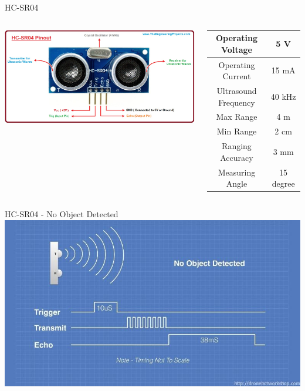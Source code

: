 \documentclass[12pt,letterpaper]{beamer}
\begin{document}
\begin{frame}{HC-SR04}
    \begin{columns}
        \includegraphics[width=1.1\linewidth]{HC-SR04}

        {\scriptsize
            \begin{tabular}{ cc }
                \hline
                Operating Voltage & 5 V  \\
                \hline
                Operating Current & 15 mA  \\
                \hline
                Ultrasound Frequency & 40 kHz  \\
                \hline
                Max Range & 4 m  \\
                \hline
                Min Range & 2 cm  \\
                \hline
                Ranging Accuracy & 3 mm  \\
                \hline
                Measuring Angle & 15 degree  \\
                \hline
            \end{tabular}
        }
    \end{columns}
\end{frame}

\begin{frame}{HC-SR04 - No Object Detected}
    \includegraphics[width=.95\linewidth]{no_object}
\end{frame}
\end{document}
